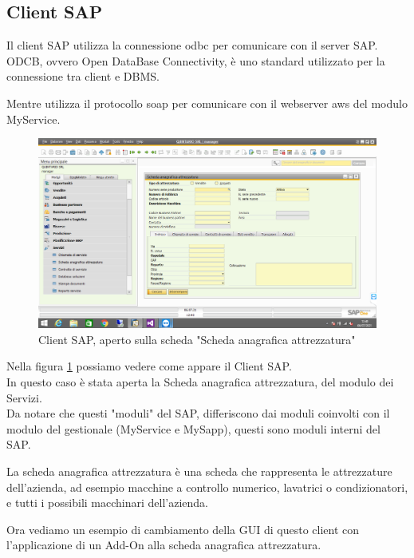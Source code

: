 \subsection{Client SAP}
\begin{flushleft}
	\item Il client SAP utilizza la connessione \gls{odbc} per comunicare con il server SAP.\\ODCB, ovvero Open DataBase Connectivity, è uno standard utilizzato per la connessione tra client e DBMS. 
	\item Mentre utilizza il protocollo \gls{soap} per comunicare con il webserver \gls{aws} del modulo MyService.
\end{flushleft}
\begin{figure}[!h] 
	\centering 
	\includegraphics[scale = 0.4]{immagini/client-sap.png} 
	\caption {Client SAP, aperto sulla scheda "Scheda anagrafica attrezzatura"}
	\label{fig:2-4}
\end{figure}
\begin{flushleft}
	\item Nella figura \ref{fig:2-4} possiamo vedere come appare il Client SAP.\\In questo caso è stata aperta la Scheda anagrafica attrezzatura, del modulo dei Servizi.\\Da notare che questi "moduli" del SAP, differiscono dai moduli coinvolti con il modulo del gestionale (MyService e MySapp), questi sono moduli interni del SAP.
	\item La scheda anagrafica attrezzatura è una scheda che rappresenta le attrezzature dell'azienda, ad esempio macchine a controllo numerico, lavatrici o condizionatori, e tutti i possibili macchinari dell'azienda.
	\item Ora vediamo un esempio di cambiamento della GUI di questo client con l'applicazione di un Add-On alla scheda anagrafica attrezzatura.
\end{flushleft}
